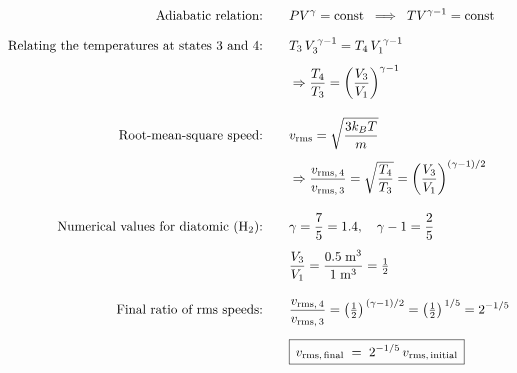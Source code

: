 \documentclass[12pt]{article}
\theoremstyle{definition} %
\theoremstyle{plain} %
\begin{document}
      \begin{align}
        \text{Adiabatic relation:}\qquad 
          & PV^{\gamma} = \text{const} 
             \;\;\Longrightarrow\;\;
             TV^{\gamma-1}= \text{const} \\[6pt]
        \text{Relating the temperatures at states 3 and 4:}\qquad
          & T_3\,V_3^{\,\gamma-1} = T_4\,V_1^{\,\gamma-1} \\[4pt]
          & \Rightarrow 
            \frac{T_4}{T_3} 
            =\biggl(\frac{V_3}{V_1}\biggr)^{\gamma-1} \\[10pt]
        \text{Root‐mean‐square speed:}\qquad
          & v_{\text{rms}} = \sqrt{\frac{3k_B T}{m}} \\[4pt]
          & \Rightarrow
            \frac{v_{\text{rms},\,4}}{v_{\text{rms},\,3}}
            = \sqrt{\frac{T_4}{T_3}}
            = \biggl(\frac{V_3}{V_1}\biggr)^{(\gamma-1)/2} \\[10pt]
        \text{Numerical values for diatomic }(\mathrm{H_2})\text{:}\qquad
          & \gamma = \frac{7}{5} = 1.4,
            \quad \gamma - 1 = \frac{2}{5} \\[4pt]
          & \frac{V_3}{V_1} = \frac{0.5\;\text{m}^3}{1\;\text{m}^3} 
                             = \tfrac12 \\[10pt]
        \text{Final ratio of rms speeds:}\qquad
          & \frac{v_{\text{rms},\,4}}{v_{\text{rms},\,3}}
            = \bigl(\tfrac12\bigr)^{\,(\gamma-1)/2}
            = \bigl(\tfrac12\bigr)^{\,1/5}
            = 2^{-1/5} \\[6pt]
        & \boxed{\,v_{\text{rms,\,final}}
                 \;=\;
                 2^{-1/5}\,v_{\text{rms,\,initial}}\,}
        \end{align}
\end{document}
